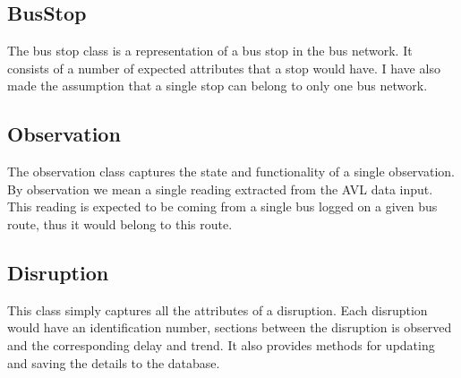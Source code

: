 \subsection{BusStop}
The bus stop class is a representation of a bus stop in the bus network. It consists of a number of expected attributes that a stop would have. I have also made the assumption that a single stop can belong to only one bus network.

\subsection{Observation}
The observation class captures the state and functionality of a single observation. By observation we mean a single reading extracted from the AVL data input. This reading is expected to be coming from a single bus logged on a given bus route, thus it would belong to this route. 

\subsection{Disruption}
This class simply captures all the attributes of a disruption. Each disruption would have an identification number, sections between the disruption is observed and the corresponding delay and trend. It also provides methods for updating and saving the details to the database.


